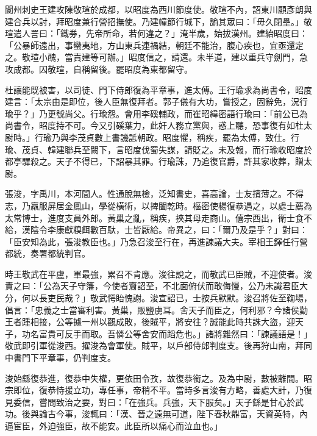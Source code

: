 \begin{pinyinscope}
 閬州刺史王建攻陳敬瑄於成都，以昭度為西川節度使。敬瑄不內，詔東川顧彥朗與建合兵以討，拜昭度兼行營招撫使。乃建幢節行城下，諭其眾曰：「毋久閉壘。」敬瑄遣人詈曰：「鐵券，先帝所命，若何違之？」淹半歲，始拔漢州。建紿昭度曰：「公暴師遠出，事蠻夷地，方山東兵連禍結，朝廷不能治，腹心疾也，宜亟還定之。敬瑄小醜，當責建等可辦。」昭度信之，請還。未半道，建以重兵守劍門，急攻成都。囚敬瑄，自稱留後。罷昭度為東都留守。



 杜讓能既被害，以司徒、門下侍郎復為平章事，進太傅。王行瑜求為尚書令，昭度建言：「太宗由是即位，後人臣無復拜者。郭子儀有大功，嘗授之，固辭免，況行瑜乎？」乃更號尚父。行瑜怨。會用李磎輔政，而崔昭緯密語行瑜曰：「前公已為尚書令，昭度持不可。今又引磎葉力，此奸人務立黨與，惑上聽，恐事復有如杜太尉時。」行瑜乃與李茂貞數上書譏詆朝政。昭度懼，稱疾，罷為太傅，致仕。行瑜、茂貞、韓建聯兵至闕下，言昭度伐蜀失謀，請貶之。未及報，而行瑜收昭度於都亭驛殺之。天子不得已，下詔暴其罪。行瑜誅，乃追復官爵，許其家收葬，贈太尉。



 張浚，字禹川，本河間人。性通脫無檢，泛知書史，喜高論，士友擯薄之。不得志，乃羸服屏居金鳳山，學從橫術，以捭闔乾時。樞密使楊復恭遇之，以處士薦為太常博士，進度支員外郎。黃巢之亂，稱疾，挾其母走商山。僖宗西出，衛士食不給，漢陰令李康獻糗餌數百馱，士皆厭給。帝異之，曰：「爾乃及是乎？」對曰：「臣安知為此，張浚教臣也。」乃急召浚至行在，再進諫議大夫。宰相王鐸任行營都統，奏署都統判官。



 時王敬武在平盧，軍最強，累召不肯應。浚往說之，而敬武已臣賊，不迎使者。浚責之曰：「公為天子守籓，今使者齎詔至，不北面俯伏而敢侮慢，公乃未識君臣大分，何以長吏民哉？」敬武愕眙愧謝。浚宣詔已，士按兵默默。浚召將佐至鞠場，倡言：「忠義之士當審利害。黃巢，販鹽虜耳。舍天子而臣之，何利邪？今諸侯勤王者踵相接，公等據一州以觀成敗，後賊平，將安往？誠能此時共誅大盜，迎天子，功名富貴可反手而取。吾憐公等舍安而蹈危也。」諸將雜然曰：「諫議語是！」敬武即引軍從浚西。擢浚為會軍使。賊平，以戶部侍郎判度支。後再狩山南，拜同中書門下平章事，仍判度支。



 浚始繇復恭進，復恭中失權，更依田令孜，故復恭銜之。及為中尉，數被離間。昭宗即位，復恭恃援立功，專任事，帝稍不平。當時多言浚有方略，善處大計，乃復見委信，嘗問致治之要，對曰：「在強兵。兵強，天下服矣。」天子繇是甘心於武功。後與論古今事，浚輒曰：「漢、晉之遠無可道，陛下春秋鼎富，天資英特，內逼宦臣，外迫強臣，故不能安。此臣所以痛心而泣血也。」




\end{pinyinscope}
